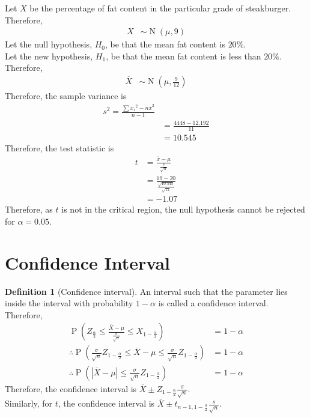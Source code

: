 \documentclass[titlepage, fleqn, a4paper, 12pt, twoside]{article}
\theoremstyle{definition}
\newtheorem{definition}{Definition}
\theoremstyle{theorem}
\DeclareMathOperator{\prob}{\mathrm{P}}
\DeclareMathOperator{\normal}{\mathrm{N}}
\begin{document}
\begin{solution}
	Let $X$ be the percentage of fat content in the particular grade of steakburger.\\
	Therefore,
	\begin{align*}
		X &\sim \normal(\mu, 9)
	\end{align*}
	Let the null hypothesis, $H_0$, be that the mean fat content is $20\%$.\\
	Let the new hypothesis, $H_1$, be that the mean fat content is less than $20\%$.\\
	Therefore,
	\begin{align*}
		\overline{X} &\sim \normal\left( \mu, \frac{9}{12} \right)
	\end{align*}
	Therefore, the sample variance is
	\begin{align*}
		s^2 = \frac{\sum {x_i}^2 - n \overline{x}^2}{n - 1}\\
		&= \frac{4448 - 12.192}{11}\\
		&= 10.545
	\end{align*}
	Therefore, the test statistic is
	\begin{align*}
		t &= \frac{\overline{x} - \mu}{\frac{s}{\sqrt{n}}}\\
		&= \frac{19 - 20}{\frac{\sqrt{10.545}}{\sqrt{12}}}\\
		&= -1.07
	\end{align*}
	Therefore, as $t$ is not in the critical region, the null hypothesis cannot be rejected for $\alpha = 0.05$.
\end{solution}

\section{Confidence Interval}

\begin{definition}[Confidence interval]
	An interval such that the parameter lies inside the interval with probability $1 - \alpha$ is called a confidence interval.
	Therefore,
	\begin{align*}
		\prob\left( Z_{\frac{\alpha}{2}} \le \frac{\overline{X} - \mu}{\frac{\sigma}{\sqrt{n}}} \le X_{1 - \frac{\alpha}{2}} \right) &= 1 - \alpha\\
		\therefore \prob\left( \frac{\sigma}{\sqrt{n}} Z_{1 - \frac{\alpha}{2}} \le \overline{X} - \mu \le \frac{\sigma}{\sqrt{n}} Z_{1 - \frac{\alpha}{2}} \right) &= 1 - \alpha\\
		\therefore \prob\left( \left| \overline{X} - \mu \right| \le \frac{\sigma}{\sqrt{n}} Z_{1 - \frac{\alpha}{2}} \right) &= 1 - \alpha
	\end{align*}
	Therefore, the confidence interval is $\overline{X} \pm Z_{1 - \frac{\alpha}{2}}\frac{\sigma}{\sqrt{n}}$.\\
	Similarly, for $t$, the confidence interval is $\overline{X} \pm t_{n - 1 , 1 - \frac{\alpha}{2}} \frac{s}{\sqrt{n}}$.
\end{definition}
\end{document}
